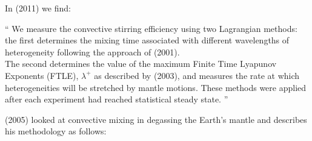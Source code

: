 In \textcite{saad11} (2011) we find:
\begin{displayquote}
{\color{darkgray}
``
We measure the convective stirring efficiency using
two Lagrangian methods: \\
the first determines the mixing
time associated with different wavelengths of heterogeneity
following the approach of \textcite{feri01} (2001).\\
The second determines the value of the maximum Finite Time
Lyapunov Exponents (FTLE), $\lambda^+$ as described by 
\textcite{fasa03} (2003), and measures the rate at which 
heterogeneities will be stretched by mantle motions. These methods
were applied after each experiment had reached statistical
steady state.
''
}
\end{displayquote}


\textcite{colt05} (2005) looked at 
convective mixing in degassing the Earth's mantle
and describes his methodology as follows:
